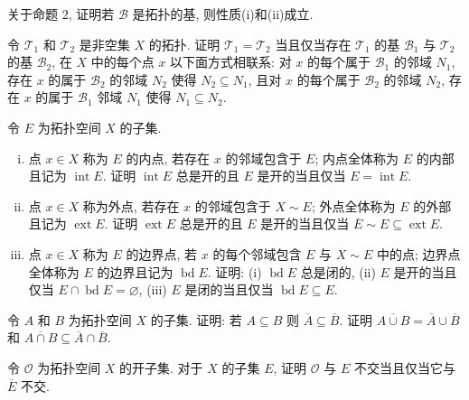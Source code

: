 \documentclass[../../main.tex]{subfiles}
\begin{document}
\begin{exercise}\label{exercise:ch11-03}
关于命题 2, 证明若 $\mathcal{B}$ 是拓扑的基, 则性质(i)和(ii)成立.
\end{exercise}

\begin{exercise}\label{exercise:ch11-04}
令 $\mathcal{T}_{1}$ 和 $\mathcal{T}_{2}$ 是非空集 $X$ 的拓扑. 证明 $\mathcal{T}_{1}=\mathcal{T}_{2}$ 当且仅当存在 $\mathcal{T}_{1}$ 的基 $\mathcal{B}_{1}$ 与 $\mathcal{T}_{2}$ 的基 $\mathcal{B}_{2}$, 在 $X$ 中的每个点 $x$ 以下面方式相联系: 对 $x$ 的每个属于 $\mathcal{B}_{1}$ 的邻域 $N_{1}$, 存在 $x$ 的属于 $\mathcal{B}_{2}$ 的邻域 $N_{2}$ 使得 $N_{2}\subseteq N_{1}$, 且对 $x$ 的每个属于 $\mathcal{B}_{2}$ 的邻域 $N_{2}$, 存在 $x$ 的属于 $\mathcal{B}_{1}$ 邻域 $N_{1}$ 使得 $N_{1}\subseteq N_{2}$.
\end{exercise}

\begin{exercise}\label{exercise:ch11-05}
令 $E$ 为拓扑空间 $X$ 的子集.
\begin{enumerate}[(i)]
\item 点 $x\in X$ 称为 $E$ 的内点, 若存在 $x$ 的邻域包含于 $E$; 内点全体称为 $E$ 的内部且记为 $\operatorname{int}E$. 证明 $\operatorname{int}E$ 总是开的且 $E$ 是开的当且仅当 $E=\operatorname{int}E$.
\item 点 $x\in X$ 称为外点, 若存在 $x$ 的邻域包含于 $X\sim E$; 外点全体称为 $E$ 的外部且记为 $\operatorname{ext}E$. 证明 $\operatorname{ext}E$ 总是开的且 $E$ 是开的当且仅当 $\overline{E}\sim E\subseteq\operatorname{ext}E$.
\item 点 $x\in X$ 称为 $E$ 的边界点, 若 $x$ 的每个邻域包含 $E$ 与 $X\sim E$ 中的点; 边界点全体称为 $E$ 的边界且记为 $\operatorname{bd}E$. 证明: (i) $\operatorname{bd}E$ 总是闭的, (ii) $E$ 是开的当且仅当 $E\cap\operatorname{bd}E=\varnothing$, (iii) $E$ 是闭的当且仅当 $\operatorname{bd}E\subseteq E$.
\end{enumerate}
\end{exercise}

\begin{exercise}\label{exercise:ch11-06}
令 $A$ 和 $B$ 为拓扑空间 $X$ 的子集. 证明: 若 $A\subseteq B$ 则 $\overline{A}\subseteq\overline{B}$. 证明 $\overline{A\cup B}=\overline{A}\cup\overline{B}$ 和 $\overline{A\cap B}\subseteq\overline{A}\cap\overline{B}$.
\end{exercise}

\begin{exercise}\label{exercise:ch11-07}
令 $\mathcal{O}$ 为拓扑空间 $X$ 的开子集. 对于 $X$ 的子集 $E$, 证明 $\mathcal{O}$ 与 $E$ 不交当且仅当它与 $\overline{E}$ 不交.
\end{exercise}
\end{document}
